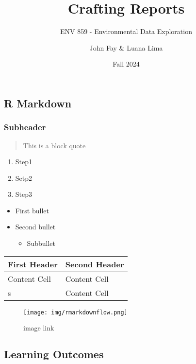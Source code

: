 \documentclass[
]{article}
\title{Crafting Reports}
\subtitle{ENV 859 - Environmental Data Exploration}
\author{John Fay \& Luana Lima}
\date{Fall 2024}
\providecommand{\tightlist}{%
  \setlength{\itemsep}{0pt}\setlength{\parskip}{0pt}}
\begin{document}
\maketitle

\subsection{R Markdown}\label{r-markdown}

\subsubsection{Subheader}\label{subheader}

\begin{quote}
This is a block quote
\end{quote}

\begin{enumerate}
\def\labelenumi{\arabic{enumi}.}
\tightlist
\item
  Step1
\item
  Setp2
\item
  Step3
\end{enumerate}

\begin{itemize}
\tightlist
\item
  First bullet
\item
  Second bullet

  \begin{itemize}
  \tightlist
  \item
    Subbullet
  \end{itemize}
\end{itemize}

\begin{longtable}[]{@{}ll@{}}
\toprule\noalign{}
First Header & Second Header \\
\midrule\noalign{}
\endhead
\bottomrule\noalign{}
\endlastfoot
Content Cell & Content Cell \\
s & Content Cell \\
\end{longtable}

\begin{figure}
\centering
\texttt{[image: img/rmarkdownflow.png]}
\caption{image link}
\end{figure}

\subsection{Learning Outcomes}\label{learning-outcomes}
\end{document}
